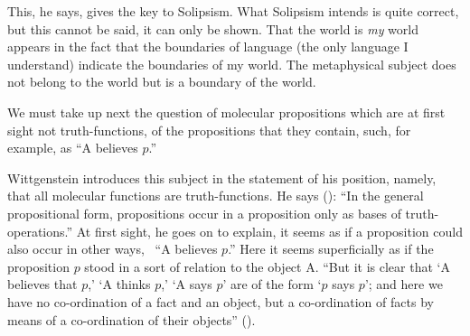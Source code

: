 This, he says, gives the key to Solipsism. What
Solipsism intends is quite correct, but this cannot be
said, it can only be shown. That the world is \emph{my} world
appears in the fact that the boundaries of language (the
only language I understand) indicate the boundaries of
my world. The metaphysical subject does not belong to
the world but is a boundary of the world.

We must take up next the question of molecular propositions
which are at first sight not truth-functions,
of the propositions that they contain, such, for example,
as ``A believes $p$.''

Wittgenstein introduces this subject in the statement
of his position, namely, that all molecular functions are
truth-functions. He says (): ``In the general propositional
form, propositions occur in a proposition only
as bases of truth-operations.'' At first sight, he goes on
to explain, it seems as if a proposition could also occur
in other ways, \exempliGratia\ ``A believes $p$.'' Here it seems superficially
as if the proposition $p$ stood in a sort of relation
to the object A. ``But it is clear that `A believes that
$p$,' `A thinks $p$,' `A says $p$' are of the form `$p$ says $p$';
and here we have no co-ordination of a fact and an object,
but a co-ordination of facts by means of a co-ordination
of their objects'' ().

